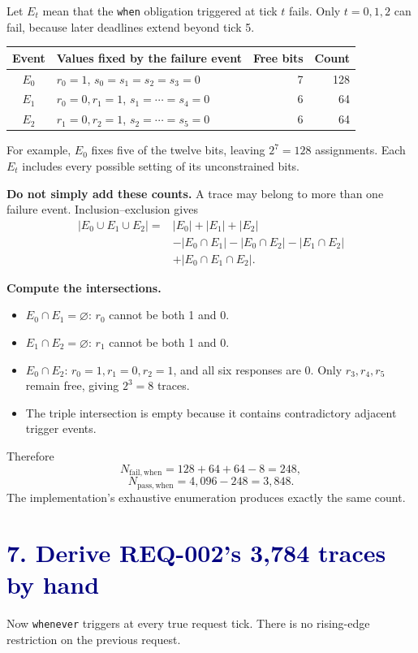\documentclass[11pt,a4paper]{article}
\newcommand{\lesson}[2]{\section*{\textcolor{navy}{#1. #2}}}
\begin{document}
Let \(E_t\) mean that the \texttt{when} obligation triggered at tick \(t\) fails. Only \(t=0,1,2\) can fail, because later deadlines extend beyond tick 5.

\begin{center}
\begin{tabular}{cp{83mm}rr}
\toprule
Event & Values fixed by the failure event & Free bits & Count\\\midrule
\(E_0\) & \(r_0=1\), \(s_0=s_1=s_2=s_3=0\) & 7 & 128\\[3pt]
\(E_1\) & \(r_0=0,r_1=1\), \(s_1=\cdots=s_4=0\) & 6 & 64\\[3pt]
\(E_2\) & \(r_1=0,r_2=1\), \(s_2=\cdots=s_5=0\) & 6 & 64\\\bottomrule
\end{tabular}
\end{center}
For example, \(E_0\) fixes five of the twelve bits, leaving \(2^7=128\) assignments. Each \(E_t\) includes every possible setting of its unconstrained bits.

\textbf{Do not simply add these counts.} A trace may belong to more than one failure event. Inclusion--exclusion gives
\begin{align*}
|E_0\cup E_1\cup E_2|
={}&|E_0|+|E_1|+|E_2|\\
&-|E_0\cap E_1|-|E_0\cap E_2|-|E_1\cap E_2|\\
&+|E_0\cap E_1\cap E_2|.
\end{align*}

\textbf{Compute the intersections.}
\begin{itemize}
\item \(E_0\cap E_1=\varnothing\): \(r_0\) cannot be both 1 and 0.
\item \(E_1\cap E_2=\varnothing\): \(r_1\) cannot be both 1 and 0.
\item \(E_0\cap E_2\): \(r_0=1,r_1=0,r_2=1\), and all six responses are 0. Only \(r_3,r_4,r_5\) remain free, giving \(2^3=8\) traces.
\item The triple intersection is empty because it contains contradictory adjacent trigger events.
\end{itemize}
Therefore
\[
N_{\mathrm{fail,when}}=128+64+64-8=248,
\]
\[
\boxed{N_{\mathrm{pass,when}}=4,096-248=3,848.}
\]
The implementation's exhaustive enumeration produces exactly the same count.
\newpage

\lesson{7}{Derive REQ-002's 3,784 traces by hand}
Now \texttt{whenever} triggers at every true request tick. There is no rising-edge restriction on the previous request.
\end{document}
